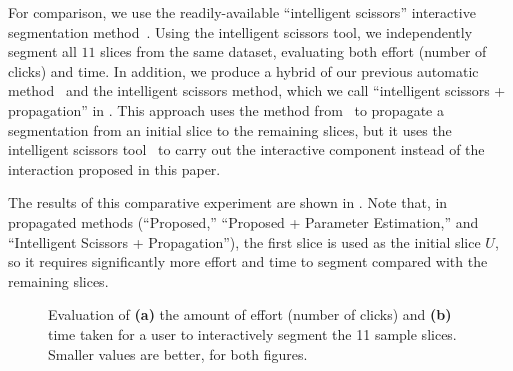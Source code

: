 \documentclass[]{spie}  %
\begin{document}
For comparison, we use the readily-available ``intelligent scissors''
interactive segmentation method~\cite{mortensen:95}.  Using the
intelligent scissors tool, we independently segment all $11$ slices
from the same dataset, evaluating both effort (number of clicks) and
time.  In addition, we produce a hybrid of our previous automatic
method~\cite{waggoner:11} and the intelligent scissors method, which
we call ``intelligent scissors + propagation'' in .  This
approach uses the method from~\cite{waggoner:11} to propagate a
segmentation from an initial slice to the remaining slices, but it
uses the intelligent scissors tool~\cite{mortensen:95} to carry out
the interactive component instead of the interaction proposed in this
paper.

The results of this comparative experiment are shown in .
Note that, in propagated methods (``Proposed,'' ``Proposed + Parameter
Estimation,'' and ``Intelligent Scissors + Propagation''), the first
slice is used as the initial slice $U$, so it requires significantly
more effort and time to segment compared with the remaining slices.
\begin{figure}[htbp]
\centering
{}
\hspace{0.1em}
\caption{Evaluation of \textbf{(a)} the amount of effort (number of
  clicks) and \textbf{(b)} time taken for a user to interactively
  segment the 11 sample slices.  Smaller values are better, for both
  figures.} \label{fig:ex}
\end{figure}
\end{document}
